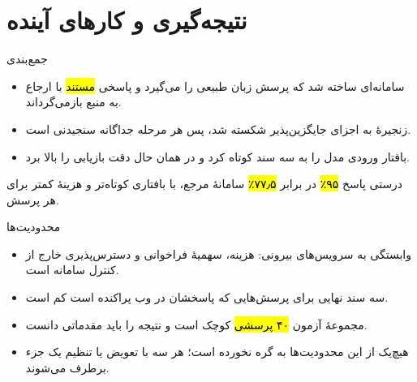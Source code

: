 \section{نتیجه‌گیری و کارهای آینده}

\begin{frame}{جمع‌بندی}
  \begin{itemize}
    \item سامانه‌ای ساخته شد که پرسش زبان طبیعی را می‌گیرد و پاسخی
          \hl{مستند} با ارجاع به منبع بازمی‌گرداند.
    \item زنجیرهٔ  به اجزای جایگزین‌پذیر شکسته
          شد، پس هر مرحله جداگانه سنجیدنی است.
    \item {} بافتار ورودی مدل را به سه سند کوتاه کرد و
          در همان حال دقت بازیابی را بالا برد.
  \end{itemize}

  \begin{PTresult}
    درستی پاسخ \hl{۹۵٪} در برابر \hl{۷۷٫۵٪} سامانهٔ مرجع، با بافتاری کوتاه‌تر و
    هزینهٔ کمتر برای هر پرسش.
  \end{PTresult}
\end{frame}

\begin{frame}{محدودیت‌ها}
  \begin{PTcons}
    \begin{itemize}
      \item وابستگی به سرویس‌های بیرونی: هزینه، سهمیهٔ فراخوانی و دسترس‌پذیری
            خارج از کنترل سامانه است.
      \item سه سند نهایی برای پرسش‌هایی که پاسخشان در وب پراکنده است کم است.
      \item مجموعهٔ آزمون \hl{۴۰ پرسشی} کوچک است و نتیجه را باید مقدماتی دانست.
    \end{itemize}
  \end{PTcons}

  \begin{itemize}
    \item هیچ‌یک از این محدودیت‌ها به  گره نخورده است؛ هر سه با
          تعویض یا تنظیم یک جزء برطرف می‌شوند.
  \end{itemize}
\end{frame}


